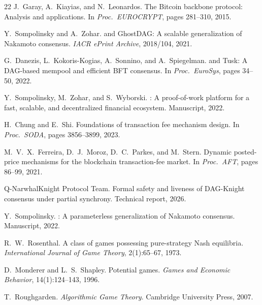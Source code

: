 \documentclass[11pt,a4paper]{article}
\theoremstyle{definition}
\theoremstyle{remark}
\begin{document}
\begin{thebibliography}{22}
J.~Garay, A.~Kiayias, and N.~Leonardos.
\newblock The {Bitcoin} backbone protocol: Analysis and applications.
\newblock In \emph{Proc.\ EUROCRYPT}, pages 281--310, 2015.

Y.~Sompolinsky and A.~Zohar.
 and {GhostDAG}: A scalable generalization of
{Nakamoto} consensus.
\newblock \emph{IACR ePrint Archive}, 2018/104, 2021.

G.~Danezis, L.~Kokoris-Kogias, A.~Sonnino, and A.~Spiegelman.
 and {Tusk}: A {DAG}-based mempool and efficient
{BFT} consensus.
\newblock In \emph{Proc.\ EuroSys}, pages 34--50, 2022.

Y.~Sompolinsky, M.~Zohar, and S.~Wyborski.
: A proof-of-work platform for a fast, scalable, and
decentralized financial ecosystem.
\newblock Manuscript, 2022.

H.~Chung and E.~Shi.
\newblock Foundations of transaction fee mechanism design.
\newblock In \emph{Proc.\ SODA}, pages 3856--3899, 2023.

M.~V.~X.~Ferreira, D.~J.~Moroz, D.~C.~Parkes, and M.~Stern.
\newblock Dynamic posted-price mechanisms for the blockchain transaction-fee
market.
\newblock In \emph{Proc.\ AFT}, pages 86--99, 2021.

Q-NarwhalKnight Protocol Team.
\newblock Formal safety and liveness of {DAG-Knight} consensus under
partial synchrony.
\newblock Technical report, 2026.

Y.~Sompolinsky.
: A parameterless generalization of {Nakamoto}
consensus.
\newblock Manuscript, 2022.

R.~W.~Rosenthal.
\newblock A class of games possessing pure-strategy {Nash} equilibria.
\newblock \emph{International Journal of Game Theory}, 2(1):65--67, 1973.

D.~Monderer and L.~S.~Shapley.
\newblock Potential games.
\newblock \emph{Games and Economic Behavior}, 14(1):124--143, 1996.

T.~Roughgarden.
\newblock \emph{Algorithmic Game Theory}.
\newblock Cambridge University Press, 2007.

\end{thebibliography}
\end{document}
